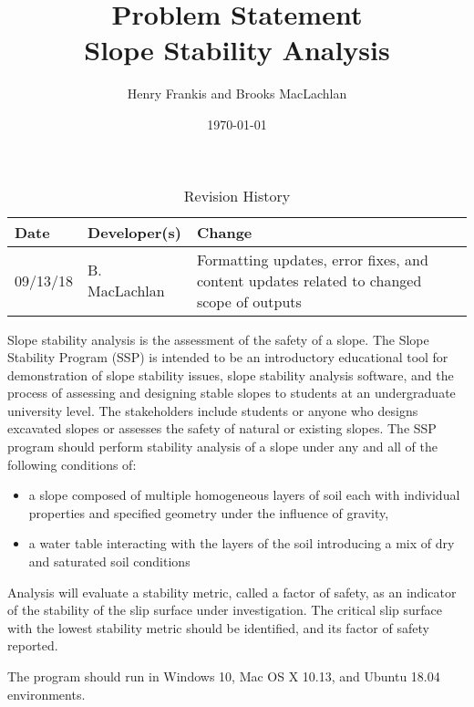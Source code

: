 \documentclass[12pt]{article}
\title{Problem Statement\\Slope Stability Analysis}
\author{Henry Frankis and Brooks MacLachlan}
\date{\today}
\begin{document}
\maketitle

\begin{table}[hp]
	\caption{Revision History} \label{TblRevisionHistory}
	\begin{tabularx}{\textwidth}{llX}
		\toprule
		\textbf{Date} & \textbf{Developer(s)} & \textbf{Change}\\
		\midrule
		09/13/18 & B. MacLachlan & Formatting updates, error fixes, and content updates related to changed scope of outputs\\
		\bottomrule
	\end{tabularx}
\end{table}

Slope stability analysis is the assessment of the safety of a slope. The Slope Stability Program (SSP) is intended to be
an introductory educational tool for demonstration
of slope stability issues, slope stability analysis 
software, and the process of assessing and
designing stable slopes to students at an undergraduate
university level. The stakeholders include students or anyone who designs excavated slopes or assesses the safety of natural or existing slopes. The SSP program should perform stability analysis of a slope under any and all of the
following conditions of:

\begin{itemize}
\item {a slope composed of multiple homogeneous layers of soil each with individual properties and specified geometry under the influence of gravity,}
\item {a water table interacting with the layers of the soil introducing a mix of dry and saturated soil conditions}
\end{itemize}

Analysis will evaluate a stability metric, called a factor of safety,
as an indicator of the stability of the slip surface under
investigation. The critical slip
surface with the lowest stability metric should be identified, and its factor of safety reported.

The program should run in Windows 10, Mac OS X 10.13, and Ubuntu 18.04 environments.
\end{document}
